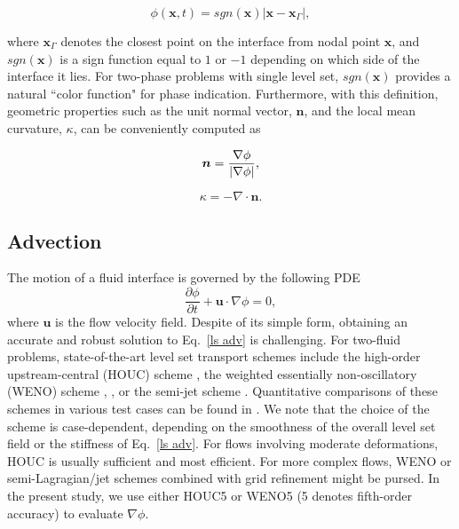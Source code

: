 \begin{equation}
    \phi({\bm x},t) = sgn({\bm x}) |{\bm x}-{\bm x_\Gamma}|,
  \label{dist ls}
\end{equation}

 \noindent where ${\bm x}_\Gamma$ denotes the closest point on the interface from nodal point ${\bm x}$, and $sgn({\bm x})$ is a sign function equal to $1$ or $-1$ depending on which side of the interface it lies. For two-phase problems with single level set, $sgn({\bm x})$ provides a natural ``color function" for phase indication. Furthermore, with this definition, geometric properties such as the unit normal vector, ${\bm n}$, and the local mean curvature, $\kappa$, can be conveniently computed as

\begin{equation}
    {\bm n} = \frac{\nabla \phi}{\lvert \nabla \phi \rvert},
  \label{normal}
\end{equation}

\begin{equation}
    \kappa = -\nabla \cdot {\bm n}.
  \label{curv}
\end{equation}




\subsection{Advection}
\label{ssubsec: ls adv}


The motion of a fluid interface is governed by the following PDE
\begin{equation}
  \frac{\partial \phi}{\partial t} + {\bm u} \cdot \nabla \phi = 0,
  \label{ls adv}
\end{equation}
where ${\bm u}$ is the flow velocity field. Despite of its simple form, obtaining an accurate and robust solution to Eq.\ \eqref{ls adv} is challenging. For two-fluid problems, state-of-the-art level set transport schemes include the high-order upstream-central (HOUC) scheme \citep{Nourgaliev_JCP_2007}, the weighted essentially non-oscillatory (WENO) scheme \citep{Liu_JCP_1994}, , or the semi-jet scheme \citep{Velmurugana_AX_2016}. Quantitative comparisons of these schemes in various test cases can be found in \cite{Nourgaliev_JCP_2007, Velmurugana_AX_2016}. We note that the choice of the scheme is case-dependent, \ie depending on the smoothness of the overall level set field or the stiffness of Eq.\ \eqref{ls adv}. For flows involving moderate deformations, HOUC is usually sufficient and most efficient. For more complex flows, WENO or semi-Lagragian/jet schemes combined with grid refinement might be pursed. In the present study, we use either HOUC5 or WENO5 (5 denotes fifth-order accuracy) to evaluate $\nabla \phi$.

